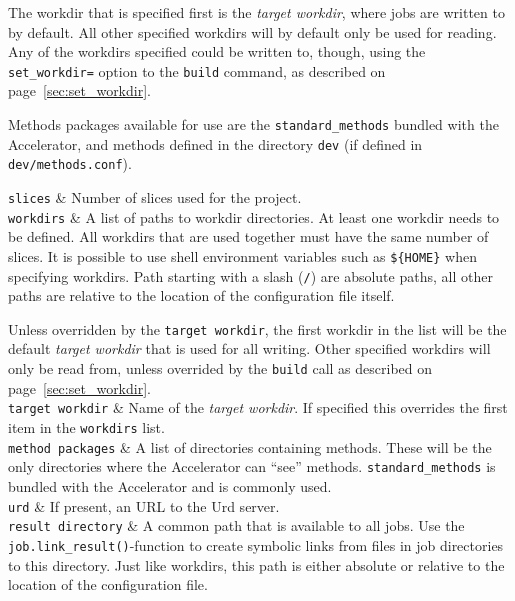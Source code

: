 The workdir that is specified first is the \textsl{target workdir},
where jobs are written to by default.  All other specified workdirs
will by default only be used for reading.  Any of the workdirs
specified could be written to, though, using the
\texttt{set\_workdir=} option to the \texttt{build} command, as
described on page~\ref{sec:set_workdir}.

Methods packages available for use are the \texttt{standard\_methods} bundled
with the Accelerator, and methods defined in the
directory \texttt{dev} (if defined in \texttt{dev/methods.conf}).

\starttabletwo

\RPtwo \texttt{slices} & Number of slices used for the project.\\[1ex]

\RPtwo \texttt{workdirs} & A list of paths to workdir directories.  At
least one workdir needs to be defined.  All workdirs that are used
together must have the same number of slices.  It is possible to use
shell environment variables such as \texttt{\$\{HOME\}} when
specifying workdirs.  Path starting with a slash (\texttt{/}) are
absolute paths, all other paths are relative to the location of the
configuration file itself.

Unless overridden by the \texttt{target workdir}, the first workdir in
the list will be the default \textsl{target workdir} that is used for
all writing.  Other specified workdirs will only be read from, unless
overrided by the \texttt{build} call as described on
page~\ref{sec:set_workdir}.\\[1ex]

\RPtwo \texttt{target workdir} & Name of the \textsl{target workdir}.
If specified this overrides the first item in the \texttt{workdirs}
list.\\[1ex]

\RPtwo \texttt{method packages} & A list of directories containing
methods.  These will be the only directories where the Accelerator can
``see'' methods.  \texttt{standard\_methods} is bundled with the
Accelerator and is commonly used.\\[1ex]

\RPtwo \texttt{urd} & If present, an URL to the Urd server.\\[1ex]

\RPtwo \texttt{result directory} & A common path that is available to
all jobs.  Use the \texttt{job.link\_result()}-function to create
symbolic links from files in job directories to this directory.  Just
like workdirs, this path is either absolute or relative to the
location of the configuration file.  \\[1ex]

